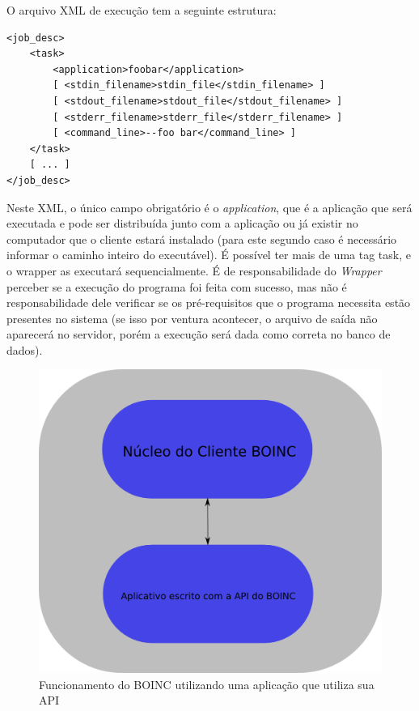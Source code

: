 O arquivo XML de execução tem a seguinte estrutura:

\begin{verbatim}
<job_desc>
    <task>
        <application>foobar</application>
        [ <stdin_filename>stdin_file</stdin_filename> ]
        [ <stdout_filename>stdout_file</stdout_filename> ]
        [ <stderr_filename>stderr_file</stderr_filename> ]
        [ <command_line>--foo bar</command_line> ]
    </task>
    [ ... ]
</job_desc>
\end{verbatim}

Neste XML, o único campo obrigatório é o \emph{application}, que é a aplicação
que será executada e pode ser distribuída junto com a aplicação ou já existir no 
computador que o cliente estará instalado (para este segundo caso é necessário
informar o caminho inteiro do executável). É possível ter mais de uma tag
task, e o wrapper as executará sequencialmente. É de responsabilidade
do \textit{Wrapper} perceber se a execução do programa foi feita com sucesso, 
mas não é responsabilidade dele verificar se os pré-requisitos que o programa necessita
estão presentes no sistema (se isso por ventura acontecer, o arquivo de saída não aparecerá 
no servidor, porém a execução será dada como correta no banco de dados). 


\begin{figure}[!h]
  \centering
  \includegraphics[scale=0.3]{boinc-api.png}
  \caption{Funcionamento do BOINC utilizando uma aplicação que utiliza sua API}
  \label{boinc-api}
\end{figure}


